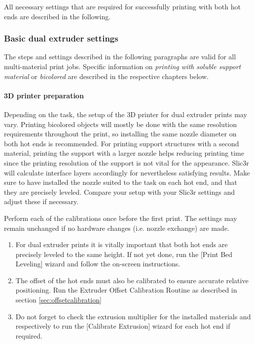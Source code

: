 All necessary settings that are required for successfully printing with both hot ends are described in the following.

\subsubsection{Basic dual extruder settings} \label{sec:dualextrusionbasics}

The steps and settings described in the following paragraphs are valid for all multi-material print jobs. Specific information on \emph{printing with soluble support material} or \emph{bicolored} are described in the respective chapters below. 

\paragraph{3D printer preparation}

Depending on the task, the setup of the 3D printer for dual extruder prints may vary.
Printing bicolored objects will mostly be done with the same resolution requirements throughout the print, so installing the same nozzle diameter on both hot ends is recommended.
For printing support structures with a second material, printing the support with a larger nozzle helps reducing printing time since the printing resolution of the support is not vital for the appearance. Slic3r will calculate interface layers accordingly for nevertheless satisfying results.
Make sure to have installed the nozzle suited to the task on each hot end, and that they are precisely leveled. Compare your setup with your Slic3r settings and adjust these if necessary.

Perform each of the calibrations once before the first print. The settings may remain unchanged if no hardware changes (i.e. nozzle exchange) are made.  

\begin{enumerate}
  \item For dual extruder prints it is vitally important that both hot ends are precisely 
        leveled to the same height. If not yet done, run the [Print Bed Leveling] wizard and follow the on-screen instructions.
  \item The offset of the hot ends must also be calibrated to ensure accurate relative
        positioning. Run the Extruder Offset Calibration Routine as described in section \ref{sec:offsetcalibration}
  \item Do not forget to check the extrusion multiplier for the installed materials and 
        respectively to run the [Calibrate Extrusion] wizard for each hot end if required.
\end{enumerate}


